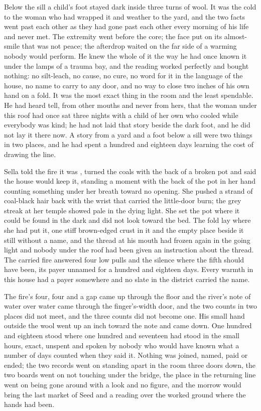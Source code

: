 Below the sill a child's foot stayed dark inside three turns of wool. It was the cold to the woman who had wrapped it and weather to the yard, and the two facts went past each other as they had gone past each other every morning of his life and never met. The extremity went before the core; the face put on its almost-smile that was not peace; the afterdrop waited on the far side of a warming nobody would perform. He knew the whole of it the way he had once known it under the lamps of a trauma bay, and the reading worked perfectly and bought nothing: no silt-leach, no cause, no cure, no word for it in the language of the house, no name to carry to any door, and no way to close two inches of his own hand on a fold. It was the most exact thing in the room and the least spendable. He had heard tell, from other mouths and never from hers, that the woman under this roof had once sat three nights with a child of her own who cooled while everybody was kind; he had not laid that story beside the dark foot, and he did not lay it there now. A story from a yard and a foot below a sill were two things in two places, and he had spent a hundred and eighteen days learning the cost of drawing the line.

Sella told the fire it was , turned the coals with the back of a broken pot and said the house would keep it, standing a moment with the back of the pot in her hand counting something under her breath toward no opening. She pushed a strand of coal-black hair back with the wrist that carried the little-door burn; the grey streak at her temple showed pale in the dying light. She set the pot where it could be found in the dark and did not look toward the bed. The fold lay where she had put it, one stiff brown-edged crust in it and the empty place beside it still without a name, and the thread at his mouth had frozen again in the going light and nobody under the roof had been given an instruction about the thread. The carried fire answered four low pulls and the silence where the fifth should have been, its payer unnamed for a hundred and eighteen days. Every warmth in this house had a payer somewhere and no slate in the district carried the name.

The fire's four, four and a gap came up through the floor and the river's note of water over water came through the finger's-width door, and the two counts in two places did not meet, and the three counts did not become one. His small hand outside the wool went up an inch toward the note and came down. One hundred and eighteen stood where one hundred and seventeen had stood in the small hours, exact, unspent and spoken by nobody who would have known what a number of days counted when they said it. Nothing was joined, named, paid or ended; the two records went on standing apart in the room three doors down, the two boards went on not touching under the bridge, the place in the returning line went on being gone around with a look and no figure, and the morrow would bring the last market of Seed and a reading over the worked ground where the hands had been.
